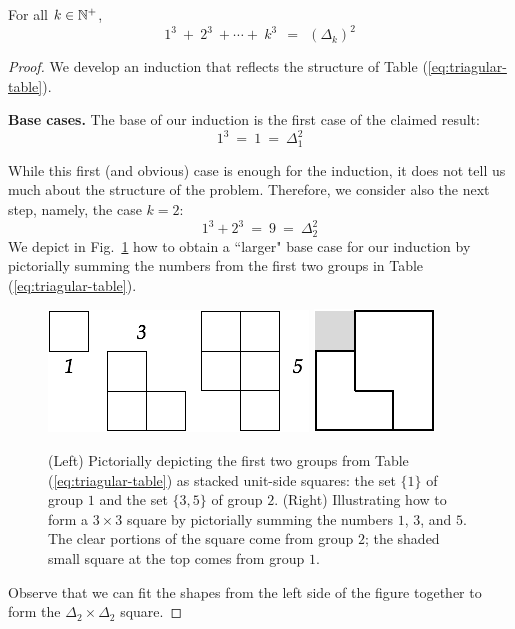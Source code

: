 \begin{prop}
\label{thm:cubes-sumto-Delta-saquared}
For all $k \in \mathbb{N}^+$,
\[ 1^3 \ + \ 2^3 \ + \cdots + \ k^3 \ \ = \ \ (\Delta_k)^2 \]
\end{prop}

\begin{proof}
We develop an induction that reflects the structure of Table (\ref{eq:triagular-table}).

{\bf Base cases.}
The base of our induction is the first case of the claimed result:
\[  1^3 \  = \ 1 \ = \ \Delta_1^2 \]

While this first (and obvious) case is enough for the induction, it does not tell us much 
about the structure of the problem.  Therefore, we consider also the next step, namely,
the case $k=2$:
\[  1^3 + 2^3 \ = \ 9 \ = \ \Delta_2^2 \]
We depict in Fig.~\ref{fig:sumCubes1} how to obtain a ``larger" base case for our induction
by pictorially summing the numbers from the first two groups in Table (\ref{eq:triagular-table}).
\begin{figure}[hbt]
\begin{center}
       \includegraphics[scale=0.35]{FiguresMaths/SumCubes1} \hspace{2cm}
       \includegraphics[scale=0.4]{FiguresMaths/SumCubes1bis}
\caption{(Left) Pictorially depicting the first two groups from Table (\ref{eq:triagular-table})
as stacked unit-side squares: the set $\{1\}$ of group $1$ and the set $\{3, 5\}$ of group $2$.
(Right) Illustrating how to form a $3 \times 3$ square by pictorially summing the numbers
$1$, $3$, and $5$.  The clear portions of the square come from 
group $2$; the shaded small square at the top comes from group $1$.}
       \label{fig:sumCubes1}
\end{center}
\end{figure}
Observe that we can fit the shapes from the left side of the figure together to form
the $\Delta_2 \times \Delta_2$ square.


\end{proof}

